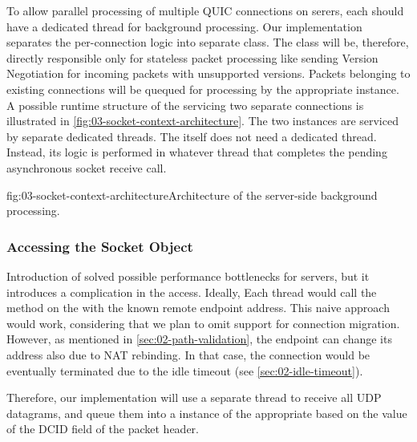To allow parallel processing of multiple QUIC connections on serers, each \QuicConnection{} should
have a dedicated thread for background processing. Our implementation separates the per-connection
logic into separate \QuicConnectionContext{} class. The \QuicSocketContext{} class will be,
therefore, directly responsible only for stateless packet processing like sending Version
Negotiation for incoming packets with unsupported versions. Packets belonging to existing
connections will be quequed for processing by the appropriate \QuicConnectionContext{} instance. A
possible runtime structure of the \QuicSocketContext{} servicing two separate connections is
illustrated in \autoref{fig:03-socket-context-architecture}. The two \QuicConnectionContext{}
instances are serviced by separate dedicated threads. The \QuicSocketContext{} itself does not need
a dedicated thread. Instead, its logic is performed in whatever thread that completes the pending
asynchronous socket receive call.

\begin{myFigure}{fig:03-socket-context-architecture}{Architecture of the server-side background processing.}

\resizebox{\linewidth}{!}{}

\end{myFigure}

\subsubsection{Accessing the Socket Object}

Introduction of \QuicConnectionContext{} solved possible performance bottlenecks for servers, but it
introduces a complication in the \Socket{} access. Ideally, Each thread would call the
 method on the \Socket{} with the known remote endpoint address. This
naive approach would work, considering that we plan to omit support for connection migration.
However, as mentioned in \autoref{sec:02-path-validation}, the endpoint can change its address also
due to NAT rebinding. In that case, the connection would be eventually terminated due to the idle
timeout (see \autoref{sec:02-idle-timeout}).

Therefore, our implementation will use a separate thread to receive all UDP datagrams, and queue
them into a  instance of the appropriate \QuicConnectionContext{} based on the
value of the DCID field of the packet header.

